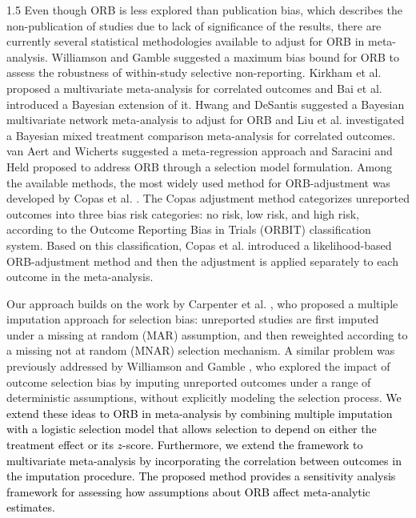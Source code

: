 \documentclass{article}
\newcommand{\mycolor}[1]{\textcolor{black}{#1}}
\begin{document}
\begin{spacing}{1.5}
Even though ORB is less explored than publication bias, which describes the non-publication of studies due to lack of significance of the results, there are currently several statistical methodologies available to adjust for ORB in meta-analysis. Williamson and Gamble \cite{williamson2007application} suggested a maximum bias bound for ORB to assess the robustness of within-study selective non-reporting. Kirkham et al. \cite{kirkham2012multivariate} proposed a multivariate meta-analysis for correlated outcomes and Bai et al. \cite{bai2021bayesian} introduced a Bayesian extension of it. Hwang and DeSantis \cite{hwang2018multivariate} suggested a Bayesian multivariate network meta-analysis to adjust for ORB and Liu et al. \cite{liu2018bayesian} investigated a Bayesian mixed treatment comparison meta-analysis for correlated outcomes. van Aert and Wicherts \cite{van2024correcting} suggested a meta-regression approach and Saracini and Held \cite{saracini2025addressing} proposed to address ORB through a selection model formulation. Among the available methods, the most widely used method for ORB-adjustment was developed by Copas et al. \cite{copas2019model}. The Copas adjustment method categorizes unreported outcomes into three bias risk categories: no risk, low risk, and high risk, according to the Outcome Reporting Bias in Trials (ORBIT) classification system. Based on this classification, Copas et al. \cite{copas2019model} introduced a likelihood-based ORB-adjustment method and then the adjustment is applied separately to each outcome in the meta-analysis. 

Our approach builds on the work by Carpenter et al. \cite{carpenter2011assessing}, who proposed a multiple imputation approach for selection bias: unreported studies are first imputed under a missing at random (MAR) assumption, and then reweighted according to a missing not at random (MNAR) selection mechanism. A similar problem was previously addressed by Williamson and Gamble \cite{williamson2005identification}, who explored the impact of outcome selection bias by imputing unreported outcomes under a range of deterministic assumptions, without explicitly modeling the selection process. \mycolor{We extend these ideas to ORB in meta-analysis by combining multiple imputation with a logistic selection model that allows selection to depend on either the treatment effect or its $z$-score. Furthermore, we extend the framework to multivariate meta-analysis by incorporating the correlation between outcomes in the imputation procedure. The proposed method provides a sensitivity analysis framework for assessing how assumptions about ORB affect meta-analytic estimates.} 


\end{spacing}
\end{document}
